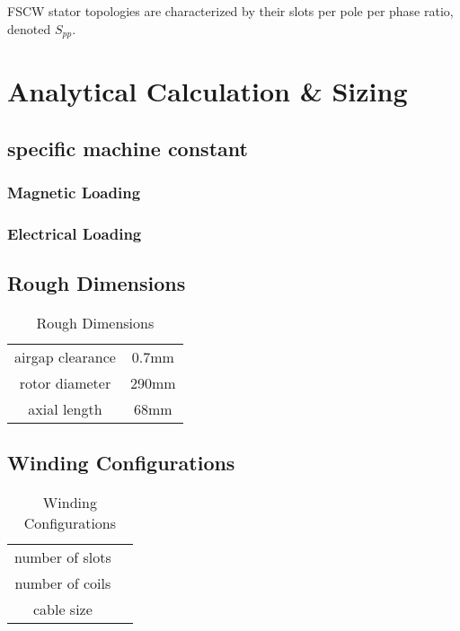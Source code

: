 \documentclass [a4 paper, 11pt, titlepage] {article}
\begin{document}
	
	
	
	
	
	
	
	
	
	
	
	FSCW stator topologies are characterized by their slots per pole per phase ratio, denoted $S_{pp}$\cite{farshadnia_advanced_2018}. 
	
	
	
	
	
	
	\section{Analytical Calculation \& Sizing}
	
	\subsection{specific machine constant}
	\subsubsection{Magnetic Loading}
	\subsubsection{Electrical Loading}
	
	\subsection{Rough Dimensions}
		\begin{table}[h]
		\begin{center}
			\begin{tabular}{c|c}
				 &  \\
				\hline
				airgap clearance & 0.7mm\\
				rotor diameter & 290mm\\
				axial length & 68mm 
			\end{tabular}
		\end{center}
		\caption{Rough Dimensions}
		\label{tab:roughDimensions}
	\end{table}
	
	
	
	
	\subsection{Winding Configurations}
		\begin{table}[h]
		\begin{center}
			\begin{tabular}{c|c}
				 &  \\
				\hline
				number of slots & \\
				number of coils & \\
				cable size & 
			\end{tabular}
		\end{center}
		\caption{Winding Configurations}
		\label{tab:windingConfigurations}
	\end{table}
	
\end{document}
